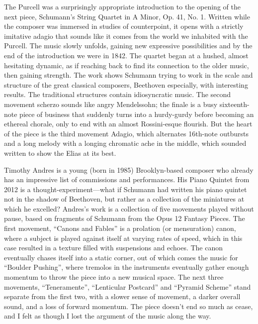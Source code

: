 The Purcell was a surprisingly appropriate introduction to the opening of the next piece, Schumann’s String Quartet in A Minor, Op. 41, No. 1. Written while the composer was immersed in studies of counterpoint, it opens with a strictly imitative adagio that sounds like it comes from the world we inhabited with the Purcell. The music slowly unfolds, gaining new expressive possibilities and by the end of the introduction we were in 1842. The quartet began at a hushed, almost hesitating dynamic, as if reaching back to find its connection to the older music, then gaining strength. The work shows Schumann trying to work in the scale and structure of the great classical composers, Beethoven especially, with interesting results. The traditional structures contain idiosyncratic music. The second movement scherzo sounds like angry Mendelssohn; the finale is a busy sixteenth-note piece of business that suddenly turns into a hurdy-gurdy before becoming an ethereal chorale, only to end with an almost Rossini-esque flourish. But the heart of the piece is the third movement Adagio, which alternates 16th-note outbursts and a long melody with a longing chromatic ache in the middle, which sounded written to show the Elias at its best.

Timothy Andres is a young (born in 1985) Brooklyn-based composer who already has an impressive list of commissions and performances. His Piano Quintet from 2012 is a thought-experiment—what if Schumann had written his piano quintet not in the shadow of Beethoven, but rather as a collection of the miniatures at which he excelled? Andres’s work is a collection of five movements played without pause, based on fragments of Schumann from the Opus 12 Fantasy Pieces. The first movement, “Canons and Fables” is a prolation (or mensuration) canon, where a subject is played against itself at varying rates of speed, which in this case resulted in a texture filled with suspensions and echoes. The canon eventually chases itself into a static corner, out of which comes the music for “Boulder Pushing”, where tremolos in the instruments eventually gather enough momentum to throw the piece into a new musical space. The next three movements, “Teneramente”, “Lenticular Postcard” and “Pyramid Scheme” stand separate from the first two, with a slower sense of movement, a darker overall sound, and a loss of forward momentum. The piece doesn’t end so much as cease, and I felt as though I lost the argument of the music along the way.


